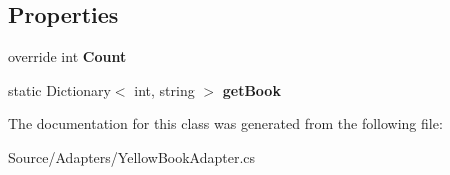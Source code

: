 \subsection*{Properties}
\begin{DoxyCompactItemize}
\item 
override int {\bfseries Count}\hypertarget{class_w_c_c_mobile_1_1_resources_1_1_yellow_book_adapter_a4e7b56a6095169557525a89edfa4036c}{}\label{class_w_c_c_mobile_1_1_resources_1_1_yellow_book_adapter_a4e7b56a6095169557525a89edfa4036c}

\item 
static Dictionary$<$ int, string $>$ {\bfseries get\+Book}\hypertarget{class_w_c_c_mobile_1_1_resources_1_1_yellow_book_adapter_a80f62c0acae6f6587de2f7f311f8961f}{}\label{class_w_c_c_mobile_1_1_resources_1_1_yellow_book_adapter_a80f62c0acae6f6587de2f7f311f8961f}

\end{DoxyCompactItemize}


The documentation for this class was generated from the following file\+:\begin{DoxyCompactItemize}
\item 
Source/\+Adapters/Yellow\+Book\+Adapter.\+cs\end{DoxyCompactItemize}
